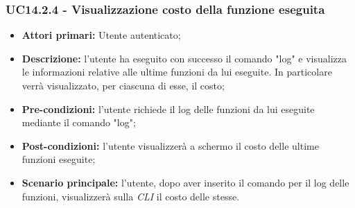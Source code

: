 \subsubsection{UC14.2.4 - Visualizzazione costo della funzione eseguita}
\begin{itemize}
	\item \textbf{Attori primari:} Utente autenticato;
	\item \textbf{Descrizione:} l'utente ha eseguito con successo il comando "log" e visualizza le informazioni relative alle ultime funzioni da lui eseguite. In particolare verrà visualizzato, per ciascuna di esse, il costo; 
	\item \textbf{Pre-condizioni:} l'utente richiede il log delle funzioni da lui eseguite mediante il comando "log"; 
	\item \textbf{Post-condizioni:} l'utente visualizzerà a schermo il costo delle ultime funzioni eseguite;
	\item \textbf{Scenario principale:} l'utente, dopo aver inserito il comando per il log delle funzioni, visualizzerà sulla \textit{CLI\glo} il costo delle stesse.
\end{itemize}